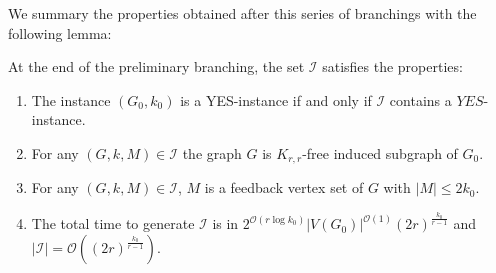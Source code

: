 \documentclass{amsart}
\newcommand{\I}{\mathcal{I}}
\renewcommand{\O}{\mathcal{O}}
\begin{document}
We summary the properties obtained after this series of branchings with the following lemma:
\begin{lemma}\label{lem:step2}
    At the end of the preliminary branching, the set $\I$ satisfies the properties:
    \begin{enumerate}
        \item The instance $(G_0, k_0)$ is a YES-instance if and only if $\I$ contains a $YES$-instance.
        \item For any $(G,k,M)\in \I$ the graph $G$ is $K_{r,r}$-free induced subgraph of $G_0$.
        \item For any $(G,k,M)\in \I$, $M$ is a feedback vertex set of $G$ with $|M|\leq 2k_0$.
        \item The total time to generate $\I$ is in $2^{\O\left (r\log k_0 \right )}|V(G_0)|^{\O(1)}(2r)^{\frac{k_0}{r-1}}$
        and $|\I|=\O\left((2r)^{\frac{k_0}{r-1}}\right)$.
    \end{enumerate}
\end{lemma}
\end{document}

